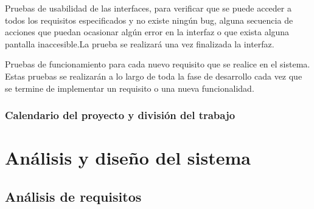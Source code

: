 \documentclass{article}
\begin{document}
Pruebas de usabilidad de las interfaces, para verificar que se puede acceder a todos los requisitos especificados y no existe ningún bug, alguna secuencia de acciones que puedan ocasionar algún error en la interfaz o que exista alguna pantalla inaccesible.La prueba se realizará una vez finalizada la interfaz.

Pruebas de funcionamiento para cada nuevo requisito que se realice en el sistema. Estas pruebas se realizarán a lo largo de toda la fase de desarrollo cada vez que se termine de implementar un requisito o una nueva funcionalidad.

\subsubsection{Calendario del proyecto y división del trabajo}


\section{Análisis y diseño del sistema}
\subsection{Análisis de requisitos}
\end{document}
